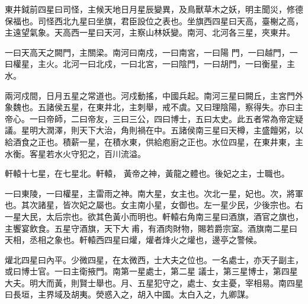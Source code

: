\begin{pinyinscope}
 東井鉞前四星曰司怪，主候天地日月星辰變異，及鳥獸草木之妖，明主聞災，修德保福也。司怪西北九星曰坐旗，君臣設位之表也。坐旗西四星曰天高，臺榭之高，主遠望氣象。天高西一星曰天河，主察山林妖變。南河、北河各三星，夾東井。



 一曰天高天之闕門，主關梁。南河曰南戍，一曰南宮，一曰陽
 門，一曰越門，一曰權星，主火。北河一曰北戍，一曰北宮，一曰陰門，一曰胡門，一曰衡星，主水。



 兩河戍間，日月五星之常道也。河戍動搖，中國兵起。南河三星曰闕丘，主宮門外象魏也。五諸侯五星，在東井北，主刺舉，戒不虞。又曰理陰陽，察得失。亦曰主帝心。一曰帝師，二曰帝友，三曰三公，四曰博士，五曰太史。此五者常為帝定疑議。星明大潤澤，則天下大治，角則禍在中。五諸侯南三星曰天樽，主盛饘粥，以給酒食之正也。積薪一星，在積水東，供給庖廚之正也。水位四星，在東井東，主水衡。客星若水火守犯之，百川流溢。



 軒轅十七星，在七星北。軒轅，
 黃帝之神，黃龍之體也。後妃之主，士職也。



 一曰東陵，一曰權星，主雷雨之神。南大星，女主也。次北一星，妃也。次，將軍也。其次諸星，皆次妃之屬也。女主南小星，女御也。左一星少民，少後宗也。右一星大民，太后宗也。欲其色黃小而明也。軒轅右角南三星曰酒旗，酒官之旗也，主饗宴飲食。五星守酒旗，天下大甫，有酒肉財物，賜若爵宗室。酒旗南二星曰天相，丞相之象也。軒轅西四星曰爟，爟者烽火之爟也，邊亭之警候。



 爟北四星曰內平。少微四星，在太微西，士大夫之位也。一名處士，亦天子副主，或曰博士官。一曰主衛掖門。南第一星處士，第二星
 議士，第三星博士，第四星大夫。明大而黃，則賢士舉也。月、五星犯守之，處士、女主憂，宰相易。南四星曰長垣，主界域及胡夷。熒惑入之，胡入中國。太白入之，九卿謀。



\end{pinyinscope}